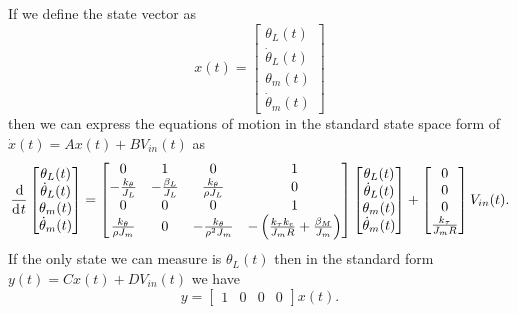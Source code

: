 If we define the state vector as
\begin{equation*}
  x(t) = \begin{bmatrix} \theta_L(t) \\ \dot \theta_L(t) \\ \theta_m(t) \\ \dot \theta_m(t) \end{bmatrix}
\end{equation*}
then we can express the equations of motion in the standard state space form of $\dot x(t) = A x(t) + B V_{in}(t)$ as
\begin{equation}
  \frac{\operatorname{d}\hspace*{-1pt}}{\operatorname{d}\hspace*{-1pt} t} \begin{bmatrix} \theta_L(t) \\ \dot \theta_L(t) \\ \theta_m(t) \\ \dot \theta_m(t) \end{bmatrix} =
  \begin{bmatrix}
	0 & 1 & 0 & 1 \\
	-\frac{k_\theta}{J_L} & -\frac{\beta_L}{J_L} & \frac{k_\theta}{\rho J_L} & 0 \\
	0 & 0 & 0 & 1 \\
	\frac{k_\theta}{\rho J_m} & 0 & -\frac{k_\theta}{\rho^2 J_m} & - \left( \frac{k_\tau k_e}{J_m R} + \frac{\beta_M}{J_m} \right)
  \end{bmatrix}
  \begin{bmatrix}
    \theta_L(t) \\ \dot \theta_L(t) \\ \theta_m(t) \\ \dot \theta_m(t)
  \end{bmatrix}
  + 
  \begin{bmatrix}
    0 \\ 0 \\ 0 \\ \frac{k_\tau}{J_m R}
  \end{bmatrix} V_{in}(t).
  \label{eq:PIDexeom}
\end{equation}
If the only state we can measure is $\theta_L(t)$ then in the standard form $y(t) = C x(t) + D V_{in}(t)$ we have
\begin{equation*}
  y = \begin{bmatrix} 1 & 0 & 0 & 0 \end{bmatrix} x(t).
\end{equation*}

